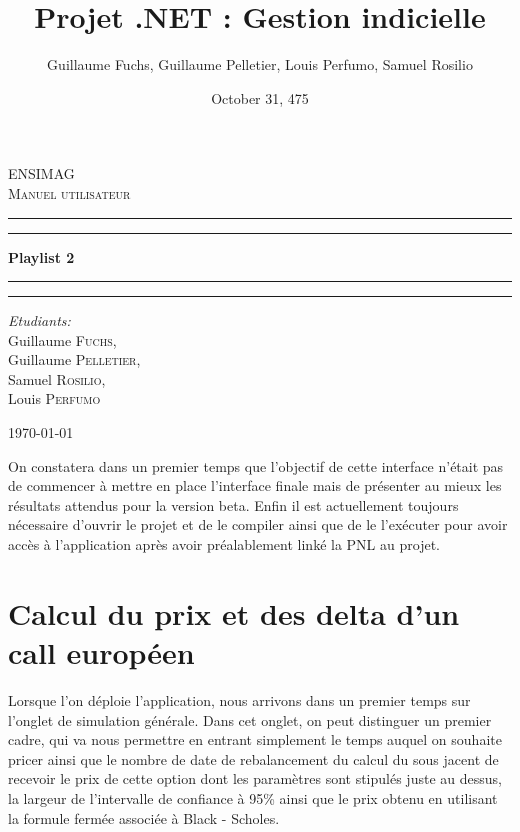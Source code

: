 \documentclass[french,12pt,a4paper]{article}
\title{Projet .NET : Gestion indicielle}
\date{October 31, 475}
\author{Guillaume Fuchs, Guillaume Pelletier, Louis Perfumo, Samuel Rosilio}
\begin{document}
\begin{titlepage}
\begin{center}

\textsc{\LARGE ENSIMAG}\\[1.5cm]

\textsc{\Large Manuel utilisateur}\\[0.5cm]

 \hrule
 \hrule 

\vspace{7mm}
{ \huge \bfseries Playlist 2  }

\vspace{7mm}
\hrule
\hrule

\vspace{7mm}
\begin{minipage}{0.4\textwidth}
\begin{flushleft} \large
\emph{Etudiants:}\\
Guillaume \textsc{Fuchs},\\
Guillaume \textsc{Pelletier},\\
Samuel \textsc{Rosilio},\\
Louis \textsc{Perfumo}
\end{flushleft}
\end{minipage}

\vfill

{\large \today}

\end{center}
\end{titlepage}
\newpage

On constatera dans un premier temps que l'objectif de cette interface n'était pas de commencer à mettre en place l'interface finale mais de présenter au mieux les résultats attendus pour la version beta. Enfin il est actuellement toujours nécessaire d'ouvrir le projet et de le compiler ainsi que de le l'exécuter pour avoir accès à l'application après avoir préalablement linké la PNL au projet.

\section{Calcul du prix et des delta d'un call européen}

\indent Lorsque l'on déploie l'application, nous arrivons dans un premier temps sur l'onglet de simulation générale. Dans cet onglet, on peut distinguer un premier cadre, qui va nous permettre en entrant simplement le temps auquel on souhaite pricer ainsi que le nombre de date de rebalancement du calcul du sous jacent de recevoir le prix de cette option dont les paramètres sont stipulés juste au dessus, la largeur de l'intervalle de confiance à 95\% ainsi que le prix obtenu en utilisant la formule fermée associée à Black - Scholes.
\end{document}
